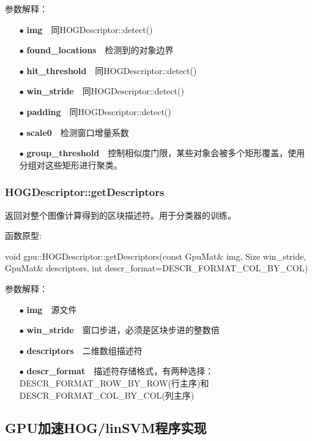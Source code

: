 \documentclass[10pt,technote,onecolumn,twoside]{IEEEtran}
\begin{document}
参数解释：
\begin{enumerate}
\item[$\bullet$]\textbf{img}~~同\textsf{HOGDescriptor::detect()}
\item[$\bullet$]\textbf{found\_locations}~~检测到的对象边界
\item[$\bullet$]\textbf{hit\_threshold}~~同\textsf{HOGDescriptor::detect()}
\item[$\bullet$]\textbf{win\_stride}~~同\textsf{HOGDescriptor::detect()}
\item[$\bullet$]\textbf{padding}~~同\textsf{HOGDescriptor::detect()}
\item[$\bullet$]\textbf{scale0}~~检测窗口增量系数
\item[$\bullet$]\textbf{group\_threshold}~~控制相似度门限，某些对象会被多个矩形覆盖，使用分组对这些矩形进行聚类。
\end{enumerate}
\subsubsection{HOGDescriptor::getDescriptors}
返回对整个图像计算得到的区块描述符。用于分类器的训练。

函数原型:

void gpu::HOGDescriptor::getDescriptors(const GpuMat\& img, Size win\_stride, \\GpuMat\& descriptors, int descr\_format=DESCR\_FORMAT\_COL\_BY\_COL)

参数解释：

\begin{enumerate}
\item[$\bullet$]\textbf{img}~~源文件
\item[$\bullet$]\textbf{win\_stride}~~窗口步进，必须是区块步进的整数倍
\item[$\bullet$]\textbf{descriptors}~~二维数组描述符
\item[$\bullet$]\textbf{descr\_format}~~描述符存储格式，有两种选择：\\ \textsf{DESCR\_FORMAT\_ROW\_BY\_ROW}(行主序)和
										\textsf{DESCR\_FORMAT\_COL\_BY\_COL}(列主序)
\end{enumerate}

\subsection{GPU加速HOG/linSVM程序实现}


%
\end{document}
